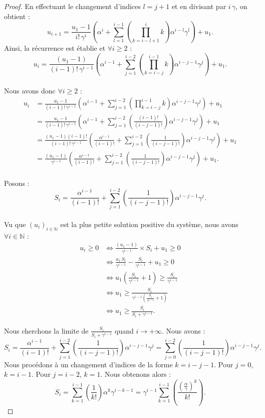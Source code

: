 \documentclass[12pt,a4paper]{report}
\theoremstyle{remark}
\begin{document}
\begin{proof}
En effectuant le changement d'indices $l=j+1$ et en divisant par $i \, \gamma$, on obtient :
$$u_{i+1}=\frac{u_1 - 1}{i! \, \gamma^{i}}\left(\alpha^{i} + \sum_{l=1}^{i-1}(\prod_{k=i-l+1}^{i} k) \alpha^{i-l} \gamma^{l}\right)+  u_1.$$
Ainsi, la récurrence est établie et $\forall i \geqslant 2$ :
$$u_i = \frac{(u_1 - 1)}{(i-1)! \, \gamma^{i-1}} \left( \alpha^{i-1} + \sum_{j=1}^{i-2}\left(\prod_{k=i-j}^{i-1} k\right) \alpha^{i-j-1} \gamma^j \right) + u_1.$$
\\
Nous avons donc $\forall i \geqslant 2$ :
\begin{align*}
u_i &= \frac{u_1 - 1}{(i-1)! \, \gamma^{i-1}} \left( \alpha^{i-1} + \sum_{j=1}^{i-2}(\prod_{k=i-j}^{i-1} k) \alpha^{i-j-1} \gamma^j \right) + u_1 \\
&= \frac{u_1 - 1}{(i-1)! \, \gamma^{i-1}} \left( \alpha^{i-1} + \sum_{j=1}^{i-2}\left(\frac{(i-1)!}{(i-j-1)!}\right) \alpha^{i-j-1} \gamma^j \right) + u_1 \\
&= \frac{(u_1 - 1)(i-1)!}{(i-1)! \, \gamma^{i-1}} \left( \frac{\alpha^{i-1}}{(i-1)!} + \sum_{j=1}^{i-2}\left(\frac{1}{(i-j-1)!}\right) \alpha^{i-j-1} \gamma^j \right) + u_1 \\
&= \frac{(u_1 - 1)}{\gamma^{i-1}} \left( \frac{\alpha^{i-1}}{(i-1)!} + \sum_{j=1}^{i-2}\left(\frac{1}{(i-j-1)!}\right) \alpha^{i-j-1} \gamma^j \right) + u_1.
\end{align*}
\\
Posons : $$S_i = \frac{\alpha^{i-1}}{(i-1)!} + \sum_{j=1}^{i-2}\left(\frac{1}{(i-j-1)!}\right) \alpha^{i-j-1} \gamma^j.$$
\\
Vu que $(u_i)_{i \in \mathbb{N}}$ est la plus petite solution positive du système, nous avons $\forall i \in \mathbb{N}$ :
\begin{align*}
u_i \geqslant 0 &\iff \frac{(u_1 - 1)}{\gamma^{i-1}} \times S_i + u_1 \geqslant 0 \\
&\iff \frac{u_1 \, S_i}{\gamma^{i-1}} - \frac{S_i}{\gamma^{i-1}} + u_1 \geqslant 0 \\
&\iff u_1 \left(\frac{S_i}{\gamma^{i-1}} + 1 \right) \geqslant \frac{S_i}{\gamma^{i-1}} \\
&\iff u_1 \geqslant \frac{S_i}{\gamma^{i-1}\left(\frac{S_i}{\gamma^{i-1}} + 1 \right)} \\
&\iff u_1 \geqslant \frac{S_i}{S_i + \gamma^{i-1}}.
\end{align*}

Nous cherchons la limite de $\frac{S_i}{S_i + \gamma^{i-1}}$ quand $i \rightarrow +\infty$. Nous avons :
$$S_i = \frac{\alpha^{i-1}}{(i-1)!}
 + \sum_{j=1}^{i-2}\left(\frac{1}{(i-j-1)!}\right) \alpha^{i-j-1} \gamma^j = \sum_{j=0}^{i-2}\left(\frac{1}{(i-j-1)!}\right) \alpha^{i-j-1} \gamma^j.$$
Nous procédons à un changement d'indices de la forme $k = i-j-1$. Pour $j=0$, $k=i-1$. Pour $j=i-2$, $k=1$. Nous obtenons alors :
$$S_i = \sum_{k=1}^{i-1}\left(\frac{1}{k!}\right) \alpha^{k} \gamma^{i-k-1} = \gamma^{i-1} \sum_{k=1}^{i-1}\left(\frac{\left(\frac{\alpha}{\gamma}\right)^k}{k!}\right).$$


\end{proof}
\end{document}
